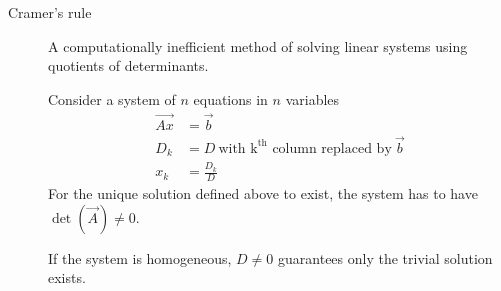 \begin{description}
    \item[Cramer's rule] A computationally inefficient method of solving linear systems
        using quotients of determinants. \par
        Consider a system of $ n $ equations in $ n $ variables
        \begin{align}
            \vec{Ax} & = \vec{b}                      \\
            D_k      & = D\ \text{with k}^{\text{th}}
            \text{ column replaced by}\ \vec{b}       \\
            x_k      & = \frac{D_k}{D}
        \end{align}
        For the unique solution defined above to exist, the system has to have
        $ \det(\vec{A}) \neq 0 $. \par
        If the system is homogeneous, $ D \neq 0 $ guarantees only the trivial solution
        exists.
\end{description}

